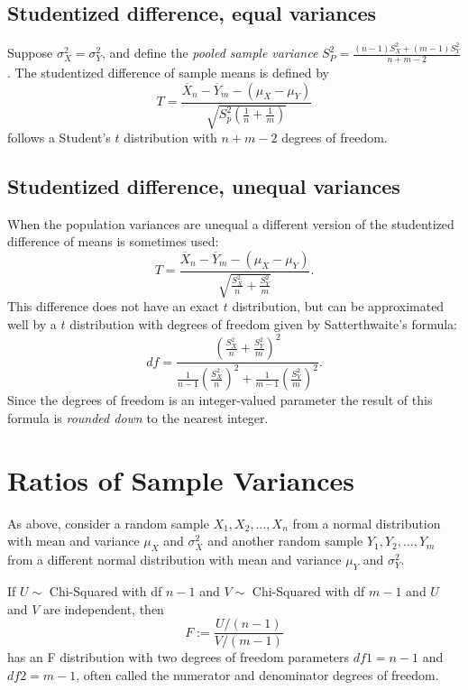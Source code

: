 \documentclass[]{book}
\begin{document}
\subsection{Studentized difference, equal
variances}\label{studentized-difference-equal-variances}

Suppose \(\sigma_X^2 = \sigma_Y^2\), and define the \emph{pooled sample
variance} \(S_P^2 = \frac{(n-1)S_X^2 + (m-1)S_Y^2}{n+m-2}\). The
studentized difference of sample means is defined by
\[T = \frac{\overline X_n - \overline Y_m - (\mu_X - \mu_Y)}{\sqrt{S_p^2(\frac{1}{n}+\frac{1}{m})}}\]
follows a Student's \(t\) distribution with \(n+m - 2\) degrees of
freedom.

\subsection{Studentized difference, unequal
variances}\label{studentized-difference-unequal-variances}

When the population variances are unequal a different version of the
studentized difference of means is sometimes used:
\[T = \frac{\overline X_n - \overline Y_m - (\mu_X - \mu_Y)}{\sqrt{\frac{S_X^2}{n}+\frac{S_Y^2}{m}}}.\]
This difference does not have an exact \(t\) distribution, but can be
approximated well by a \(t\) distribution with degrees of freedom given
by Satterthwaite's formula:
\[df = \frac{\left(\frac{S_X^2}{n}+\frac{S_Y^2}{m}\right)^2}{\frac{1}{n-1}\left(\frac{S_X^2}{n}\right)^2 + \frac{1}{m-1}\left(\frac{S_Y^2}{m}\right)^2}.\]
Since the degrees of freedom is an integer-valued parameter the result
of this formula is \emph{rounded down} to the nearest integer.

\section{Ratios of Sample Variances}\label{ratios-of-sample-variances}

As above, consider a random sample \(X_1, X_2, \ldots, X_{n}\) from a
normal distribution with mean and variance \(\mu_X\) and \(\sigma_X^2\)
and another random sample \(Y_1, Y_2, \ldots, Y_m\) from a different
normal distribution with mean and variance \(\mu_Y\) and \(\sigma_Y^2\).

If \(U\sim\) Chi-Squared with df \(n-1\) and \(V\sim\) Chi-Squared with
df \(m-1\) and \(U\) and \(V\) are independent, then
\[F := \frac{U/(n-1)}{V/(m-1)}\] has an F distribution with two degrees
of freedom parameters \(df1 = n-1\) and \(df2 = m-1\), often called the
numerator and denominator degrees of freedom.
\end{document}
